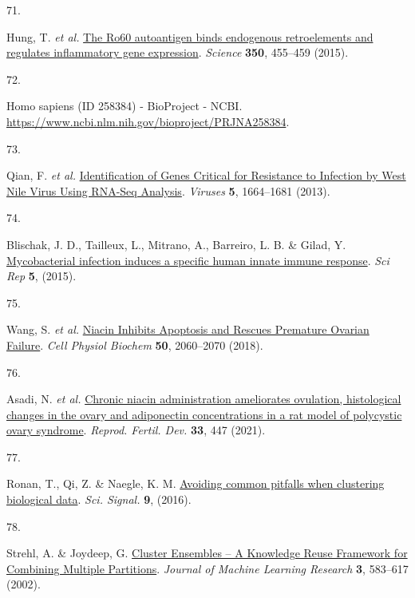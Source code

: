 \documentclass[
  a4paper,
]{article}
\newlength{\cslhangindent}
\newlength{\csllabelwidth}
\newlength{\cslentryspacingunit} %
\newenvironment{CSLReferences}[2] %
 {%
  \setlength{\parindent}{0pt}
  \ifodd #1
  \let\oldpar\par
  \def\par{\hangindent=\cslhangindent\oldpar}
  \fi
  \setlength{\parskip}{#2\cslentryspacingunit}
 }%
 {}
\newcommand{\CSLLeftMargin}[1]{\parbox[t]{\csllabelwidth}{#1}}
\newcommand{\CSLRightInline}[1]{\parbox[t]{\linewidth - \csllabelwidth}{#1}\break}
\begin{document}
\begin{CSLReferences}{0}{0}
\leavevmode{}%
\CSLLeftMargin{71. }%
\CSLRightInline{Hung, T. \emph{et al.} \href{https://doi.org/10.1126/science.aac7442}{The Ro60 autoantigen binds endogenous retroelements and regulates inflammatory gene expression}. \emph{Science} \textbf{350}, 455--459 (2015).}

\leavevmode{}%
\CSLLeftMargin{72. }%
\CSLRightInline{Homo sapiens (ID 258384) - BioProject - NCBI. \url{https://www.ncbi.nlm.nih.gov/bioproject/PRJNA258384}.}

\leavevmode{}%
\CSLLeftMargin{73. }%
\CSLRightInline{Qian, F. \emph{et al.} \href{https://doi.org/10.3390/v5071664}{Identification of Genes Critical for Resistance to Infection by West Nile Virus Using RNA-Seq Analysis}. \emph{Viruses} \textbf{5}, 1664--1681 (2013).}

\leavevmode{}%
\CSLLeftMargin{74. }%
\CSLRightInline{Blischak, J. D., Tailleux, L., Mitrano, A., Barreiro, L. B. \& Gilad, Y. \href{https://doi.org/10.1038/srep16882}{Mycobacterial infection induces a specific human innate immune response}. \emph{Sci Rep} \textbf{5}, (2015).}

\leavevmode{}%
\CSLLeftMargin{75. }%
\CSLRightInline{Wang, S. \emph{et al.} \href{https://doi.org/10.1159/000495051}{Niacin Inhibits Apoptosis and Rescues Premature Ovarian Failure}. \emph{Cell Physiol Biochem} \textbf{50}, 2060--2070 (2018).}

\leavevmode{}%
\CSLLeftMargin{76. }%
\CSLRightInline{Asadi, N. \emph{et al.} \href{https://doi.org/10.1071/rd20306}{Chronic niacin administration ameliorates ovulation, histological changes in the ovary and adiponectin concentrations in a rat model of polycystic ovary syndrome}. \emph{Reprod. Fertil. Dev.} \textbf{33}, 447 (2021).}

\leavevmode{}%
\CSLLeftMargin{77. }%
\CSLRightInline{Ronan, T., Qi, Z. \& Naegle, K. M. \href{https://doi.org/10.1126/scisignal.aad1932}{Avoiding common pitfalls when clustering biological data}. \emph{Sci. Signal.} \textbf{9}, (2016).}

\leavevmode{}%
\CSLLeftMargin{78. }%
\CSLRightInline{Strehl, A. \& Joydeep, G. \href{https://www.jmlr.org/papers/v3/strehl02a.html}{Cluster Ensembles -- A Knowledge Reuse Framework for Combining Multiple Partitions}. \emph{Journal of Machine Learning Research} \textbf{3}, 583--617 (2002).}


\end{CSLReferences}
\end{document}
